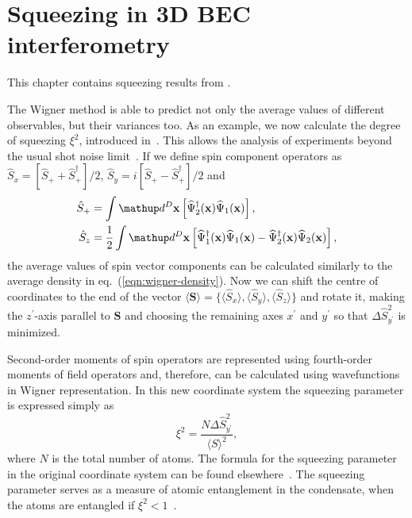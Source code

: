 \chapter{Squeezing in 3D BEC interferometry}
\label{cha:bec-squeezing}

This chapter contains squeezing results from \cite{Opanchuk2012}.



The Wigner method is able to predict not only the average values of different observables,
but their variances too.
As an example, we now calculate the degree of squeezing $\xi^2$, introduced in~\cite{Wineland1994,Sorensen2001}.
This allows the analysis of experiments beyond the usual shot noise limit~\cite{Riedel2010,Gross2010}.
If we define spin component operators as
$\hat{S}_{x} = [ \hat{S}_+ + \hat{S}_+^\dagger ] / 2 $,
$\hat{S}_{y} = i [ \hat{S}_+ - \hat{S}_+^\dagger ] / 2 $ and
\begin{equation}
\begin{split}
    \hat{S}_+ & = \int \upd^D\xvec \left[
        \widehat{\Psi}^\dagger_2 (\xvec) \widehat{\Psi}_1 (\xvec)
    \right], \\
    \hat{S}_z & = \frac{1}{2} \int \upd^D\xvec \left[
        \widehat{\Psi}^\dagger_1 (\xvec) \widehat{\Psi}_1 (\xvec)
        - \widehat{\Psi}^\dagger_2 (\xvec) \widehat{\Psi}_2 (\xvec)
    \right],
\end{split}
\end{equation}
the average values of spin vector components can be calculated similarly to the average density in
eq.~(\ref{eqn:wigner-density}).
Now we can shift the centre of coordinates to the end of the vector
$\langle \mathbf{S} \rangle = \{ \langle \hat{S}_x \rangle, \langle \hat{S}_y \rangle, \langle \hat{S}_z \rangle \}$
and rotate it, making the $z^\prime$-axis parallel to $\mathbf{S}$ and choosing the remaining axes $x^\prime$ and $y^\prime$ so that
$\Delta \hat{S}^2_{y^\prime} $ is minimized.

Second-order moments of spin operators are represented using fourth-order moments of field operators
and, therefore, can be calculated using wavefunctions in Wigner representation.
In this new coordinate system the squeezing parameter is expressed simply as
\begin{equation}
\label{eqn:squeezing}
    \xi^2 = \frac{N \Delta \hat{S}^2_{y^\prime}}{\langle S \rangle^2},
\end{equation}
where $N$ is the total number of atoms.
The formula for the squeezing parameter in the original coordinate system can be found elsewhere~\cite{Li2009}.
The squeezing parameter serves as a measure of atomic entanglement in the condensate,
when the atoms are entangled if $\xi^2 < 1$~\cite{Sorensen2001}.





